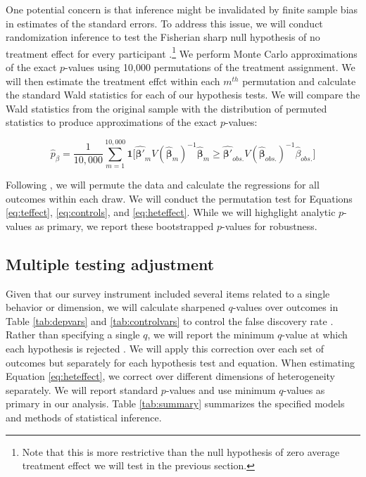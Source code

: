 \documentclass[11pt, a4paper]{article}\usepackage[]{graphicx}\usepackage[]{color}
\begin{document}
        One potential concern is that inference might be invalidated by finite sample bias in estimates of the standard errors. To address this issue, we will conduct randomization inference to test the Fisherian sharp null hypothesis of no treatment effect for every participant \parencite{fisher_design_1935}.\footnote{Note that this is more restrictive than the null hypothesis of zero average treatment effect we will test in the previous section.} We perform Monte Carlo approximations of the exact $p$-values using 10,000 permutations of the treatment assignment. We will then estimate the treatment effct within each $m^{th}$ permutation and calculate the standard Wald statistics for each of our hypothesis tests. We will compare the Wald statistics from the original sample with the distribution of permuted statistics to produce approximations of the exact $p$-values:

        \begin{equation} \label{eq:exactp}
            \hat{p}_{\beta} =  \frac{1}{10,000}\sum_{m=1}^{10,000} \mathbf{1} \Big [ \mathbf{\hat{\beta'}}_m V(\mathbf{\hat{\beta}}_m)^{-1} \mathbf{\hat{\beta}}_m \geq \mathbf{\hat{\beta'}}_{obs.} V(\mathbf{\hat{\beta}}_{obs.})^{-1} \hat{\beta}_{obs.} \Big ]
        \end{equation}

        Following \textcite{young_channeling_2015}, we will permute the data and calculate the regressions for all outcomes within each draw. We will conduct the permutation test for Equations \ref{eq:teffect}, \ref{eq:controls}, and \ref{eq:heteffect}. While we will highglight analytic $p$-values as primary, we report these bootstrapped $p$-values for robustness.

    \subsection{Multiple testing adjustment}

        Given that our survey instrument included several items related to a single behavior or dimension, we will calculate sharpened $q$-values over outcomes in Table \ref{tab:depvars} and \ref{tab:controlvars} to control the false discovery rate \parencite{benjamini_adaptive_2006}. Rather than specifying a single $q$, we will report the minimum $q$-value at which each hypothesis is rejected \parencite{anderson_multiple_2008}. We will apply this correction over each set of outcomes but separately for each hypothesis test and equation. When estimating Equation \ref{eq:heteffect}, we correct over different dimensions of heterogeneity separately. We will report standard $p$-values and use minimum $q$-values as primary in our analysis. Table \ref{tab:summary} summarizes the specified models and methods of statistical inference.
\end{document}
